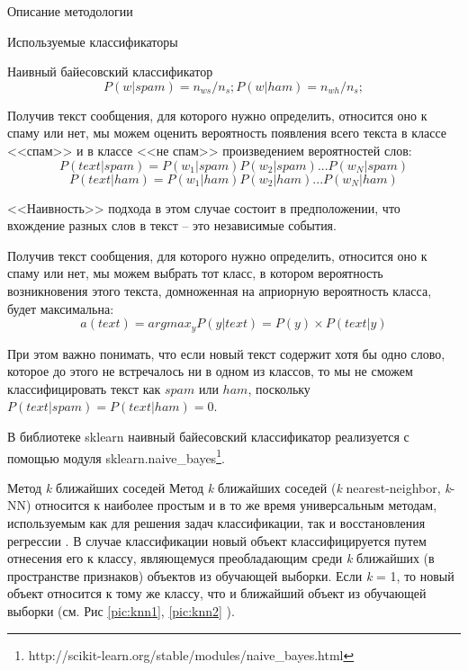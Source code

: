 \begin{section}{Описание методологии}
\begin{subsection}{Используемые классификаторы}
\begin{subsubsection}{Наивный байесовский классификатор}
\begin{equation}
  P(w|spam) = n_{ws}/n_s; P(w|ham) = n_{wh}/n_s;
\end{equation}

Получив текст сообщения, для которого нужно определить, относится оно к спаму или нет, мы можем оценить вероятность появления всего текста в классе <<спам>> и в классе <<не спам>> произведением вероятностей слов:
\begin{equation}
P(text|spam) = P(w_1|spam)P(w_2|spam)...P(w_N|spam)
\end{equation}
\begin{equation}
P(text|ham) = P(w_1|ham)P(w_2|ham)...P(w_N|ham)
\end{equation}

<<Наивность>> подхода в этом случае состоит в предположении, что вхождение разных слов в текст – это независимые события.

Получив текст сообщения, для которого нужно определить, относится оно к спаму или нет, мы можем выбрать тот класс, в котором вероятность возникновения этого текста, домноженная на априорную вероятность класса, будет максимальна:
\begin{equation}
a(text) = arg⁡max_{y}⁡ P(y|text) = P(y) \times P(text|y)
\end{equation}

При этом важно понимать, что если новый текст содержит хотя бы одно слово, которое до этого не встречалось ни в одном из классов, то мы не сможем классифицировать текст как $spam$ или $ham$, поскольку $P(text|spam) = P(text|ham) = 0$.


В библиотеке sklearn наивный байесовский классификатор реализуется с помощью модуля sklearn.naive\_bayes\footnote{http://scikit-learn.org/stable/modules/naive\_bayes.html}.


\end{subsubsection}

    \begin{subsubsection}{Метод \textit{k} ближайших соседей}
      \label{alg:knn}
      Метод \textit{k} ближайших соседей (\textit{k} nearest-neighbor, \textit{k}-NN) относится к наиболее простым и в то же время универсальным методам, используемым как для решения задач классификации, так и восстановления регрессии \cite{wiki:knn}. В случае классификации новый объект классифицируется путем отнесения его к классу, являющемуся преобладающим среди \textit{k} ближайших (в пространстве признаков) объектов из обучающей выборки. Если \textit{k} = 1, то новый объект относится к тому же классу, что и ближайший объект из обучающей выборки (см. Рис \ref{pic:knn1}, \ref{pic:knn2} ).


\end{subsubsection}
\end{subsection}
\end{section}
